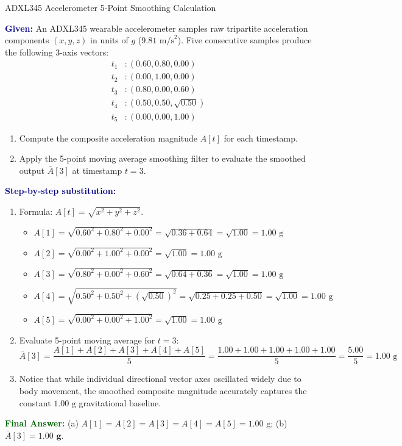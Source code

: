 \documentclass[11pt,a4paper,openany]{report}
\newcommand{\Given}{\par\textbf{\textcolor{navy}{Given:}} }
\newcommand{\Steps}{\par\textbf{\textcolor{navy}{Step-by-step substitution:}}\par}
\newcommand{\Answer}{\par\textbf{\textcolor{darkgreen}{Final Answer:}} }
\begin{document}
\begin{solved}{ADXL345 Accelerometer 5-Point Smoothing Calculation}
\Given An ADXL345 wearable accelerometer samples raw tripartite acceleration components $(x, y, z)$ in units of $g$ ($9.81\text{ m/s}^2$). Five consecutive samples produce the following 3-axis vectors:
\begin{align*}
t_1 &: (0.60, 0.80, 0.00) \\
t_2 &: (0.00, 1.00, 0.00) \\
t_3 &: (0.80, 0.00, 0.60) \\
t_4 &: (0.50, 0.50, \sqrt{0.50}) \\
t_5 &: (0.00, 0.00, 1.00)
\end{align*}
\begin{enumerate}[label=(\alph*),leftmargin=*]
  \item Compute the composite acceleration magnitude $A[t]$ for each timestamp.
  \item Apply the 5-point moving average smoothing filter to evaluate the smoothed output $\bar{A}[3]$ at timestamp $t=3$.
\end{enumerate}
\Steps
\begin{enumerate}[leftmargin=*]
  \item Formula: $A[t] = \sqrt{x^2 + y^2 + z^2}$.
  \begin{itemize}
    \item $A[1] = \sqrt{0.60^2 + 0.80^2 + 0.00^2} = \sqrt{0.36 + 0.64} = \sqrt{1.00} = 1.00\text{ g}$
    \item $A[2] = \sqrt{0.00^2 + 1.00^2 + 0.00^2} = \sqrt{1.00} = 1.00\text{ g}$
    \item $A[3] = \sqrt{0.80^2 + 0.00^2 + 0.60^2} = \sqrt{0.64 + 0.36} = \sqrt{1.00} = 1.00\text{ g}$
    \item $A[4] = \sqrt{0.50^2 + 0.50^2 + (\sqrt{0.50})^2} = \sqrt{0.25 + 0.25 + 0.50} = \sqrt{1.00} = 1.00\text{ g}$
    \item $A[5] = \sqrt{0.00^2 + 0.00^2 + 1.00^2} = \sqrt{1.00} = 1.00\text{ g}$
  \end{itemize}
  \item Evaluate 5-point moving average for $t=3$:
  \begin{equation}
  \bar{A}[3] = \frac{A[1] + A[2] + A[3] + A[4] + A[5]}{5} = \frac{1.00 + 1.00 + 1.00 + 1.00 + 1.00}{5} = \frac{5.00}{5} = 1.00\text{ g}
  \end{equation}
  \item Notice that while individual directional vector axes oscillated widely due to body movement, the smoothed composite magnitude accurately captures the constant $1.00\text{ g}$ gravitational baseline.
\end{enumerate}
\Answer (a) $A[1]=A[2]=A[3]=A[4]=A[5]=1.00\text{ g}$; (b) $\bar{A}[3] = \mathbf{1.00\text{ g}}$.
\end{solved}
\end{document}
